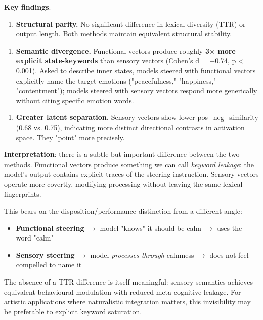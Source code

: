 \documentclass[11pt,a4paper]{article}
\begin{document}
\textbf{Key findings}:

\begin{enumerate}[leftmargin=*]
  \item \textbf{Structural parity.} No significant difference in lexical diversity (TTR) or output length. Both methods maintain equivalent structural stability.
\end{enumerate}

\begin{enumerate}[leftmargin=*]
  \item \textbf{Semantic divergence.} Functional vectors produce roughly \textbf{3\ensuremath{\times} more explicit state-keywords} than sensory vectors (Cohen's d = \ensuremath{-}0.74, p < 0.001). Asked to describe inner states, models steered with functional vectors explicitly name the target emotions ("peacefulness," "happiness," "contentment"); models steered with sensory vectors respond more generically without citing specific emotion words.
\end{enumerate}

\begin{enumerate}[leftmargin=*]
  \item \textbf{Greater latent separation.} Sensory vectors show lower pos\_neg\_similarity (0.68 vs. 0.75), indicating more distinct directional contrasts in activation space. They "point" more precisely.
\end{enumerate}

\textbf{Interpretation}: there is a subtle but important difference between the two methods. Functional vectors produce something we can call \emph{keyword leakage}: the model's output contains explicit traces of the steering instruction. Sensory vectors operate more covertly, modifying processing without leaving the same lexical fingerprints.

This bears on the disposition/performance distinction from a different angle:

\begin{itemize}[leftmargin=*]
  \item \textbf{Functional steering} \ensuremath{\rightarrow} model "knows" it should be calm \ensuremath{\rightarrow} uses the word "calm"
  \item \textbf{Sensory steering} \ensuremath{\rightarrow} model \emph{processes through} calmness \ensuremath{\rightarrow} does not feel compelled to name it
\end{itemize}

The absence of a TTR difference is itself meaningful: sensory semantics achieves equivalent behavioural modulation with reduced meta-cognitive leakage. For artistic applications where naturalistic integration matters, this invisibility may be preferable to explicit keyword saturation.
\end{document}
